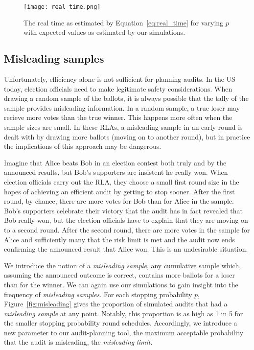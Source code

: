 \begin{figure}
\texttt{[image: real\_time.png]}
\caption{The real time as estimated by Equation~\ref{eq:real_time} for varying $p$ with expected values as estimated by our simulations.}
\label{fig:real_time}
\end{figure}


\subsection{Misleading samples}

Unfortunately, efficiency alone is not sufficient for planning audits. In the US today, election officials need to make legitimate safety considerations.
When drawing a random sample of the ballots, it is always possible that the tally of the sample provides misleading information. In a random sample, a true loser may recieve more votes than the true winner. This happens more often when the sample sizes are small.
In these RLAs, a misleading sample in an early round is dealt with by drawing more ballots (moving on to another round), but in practice the implications of this approach may be dangerous.

Imagine that Alice beats Bob in an election contest both truly and by the announced results, but Bob's supporters are insistent he really won. When election officials carry out the RLA, they choose a small first round size in the hopes of achieving an efficient audit by getting to stop sooner. After the first round, by chance, there are more votes for Bob than for Alice in the sample. Bob's supporters celebrate their victory that the audit has in fact revealed that Bob really won, but the election officials have to explain that they are moving on to a second round. After the second round, there are more votes in the sample for Alice and sufficiently many that the risk limit is met and the audit now ends confirming the announced result that Alice won. This is an undesirable situation.

We introduce the notion of a \emph{misleading sample}, any cumulative sample which, assuming the announced outcome is correct, contains more ballots for a loser than for the winner.
We can again use our simulations to gain insight into the frequency of \emph{misleading samples}.
For each stopping probability $p$, Figure~\ref{fig:misleading} gives the proportion of simulated audits that had a \emph{misleading sample} at any point. 
Notably, this proportion is as high as 1 in 5 for the smaller stopping probability round schedules.
Accordingly, we introduce a new parameter to our audit-planning tool, the maximum acceptable probability that the audit is misleading, the \emph{misleading limit}.


